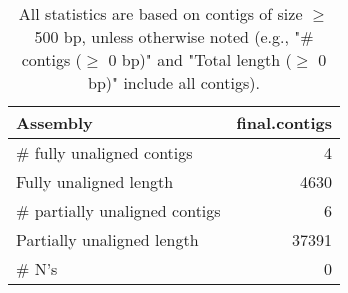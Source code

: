 \documentclass[12pt,a4paper]{article}
\begin{document}
\begin{table}[ht]
\begin{center}
\caption{All statistics are based on contigs of size $\geq$ 500 bp, unless otherwise noted (e.g., "\# contigs ($\geq$ 0 bp)" and "Total length ($\geq$ 0 bp)" include all contigs).}
\begin{tabular}{|l*{1}{|r}|}
\hline
Assembly & final.contigs \\ \hline
\# fully unaligned contigs & 4 \\ \hline
Fully unaligned length & 4630 \\ \hline
\# partially unaligned contigs & 6 \\ \hline
Partially unaligned length & 37391 \\ \hline
\# N's & 0 \\ \hline
\end{tabular}
\end{center}
\end{table}
\end{document}
